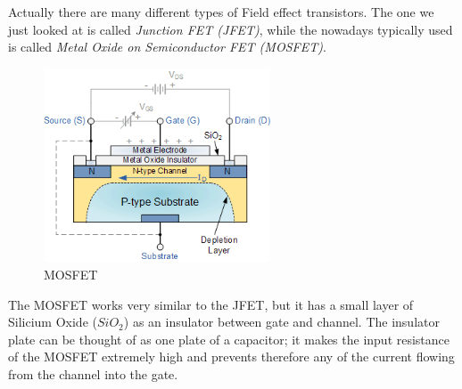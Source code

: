 \documentclass[11pt]{article}
\begin{document}
Actually there are many different types of Field effect transistors. The one we just looked at is called \textit{Junction FET (JFET)}, while the nowadays typically used is called \textit{Metal Oxide on Semiconductor FET (MOSFET)}. 

\begin{figure}[H]
\centering
\includegraphics[width=0.6\textwidth]{mosfet.png}%
\caption{MOSFET}
\label{fig:mosfet}
\end{figure}


The MOSFET works very similar to the JFET, but it has a small layer of Silicium Oxide ($SiO_2$) as an insulator between gate and channel. The insulator plate can be thought of as one plate of a capacitor; it makes the input resistance of the MOSFET extremely high and prevents therefore any of the current flowing from the channel into the gate.   
\end{document}
